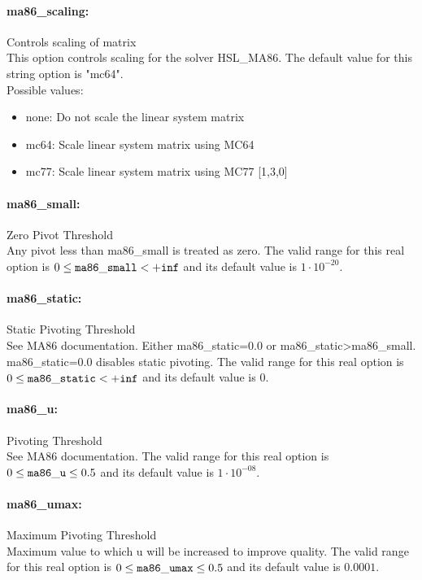 \paragraph{ma86\_scaling:}\label{opt:ma86_scaling} Controls scaling of matrix \\
 This option controls scaling for the solver HSL\_MA86. The default value for this string option is "mc64".
\\ 
Possible values:
\begin{itemize}
   \item none: Do not scale the linear system matrix
   \item mc64: Scale linear system matrix using MC64
   \item mc77: Scale linear system matrix using MC77 [1,3,0]
\end{itemize}

\paragraph{ma86\_small:}\label{opt:ma86_small} Zero Pivot Threshold \\
 Any pivot less than ma86\_small is treated as zero. The valid range for this real option is 
$0 \le {\tt ma86\_small } <  {\tt +inf}$
and its default value is $1 \cdot 10^{-20}$.


\paragraph{ma86\_static:}\label{opt:ma86_static} Static Pivoting Threshold \\
 See MA86 documentation. Either ma86\_static=0.0 or ma86\_static>ma86\_small. ma86\_static=0.0 disables static pivoting. The valid range for this real option is 
$0 \le {\tt ma86\_static } <  {\tt +inf}$
and its default value is $0$.


\paragraph{ma86\_u:}\label{opt:ma86_u} Pivoting Threshold \\
 See MA86 documentation. The valid range for this real option is 
$0 \le {\tt ma86\_u } \le 0.5$
and its default value is $1 \cdot 10^{-08}$.


\paragraph{ma86\_umax:}\label{opt:ma86_umax} Maximum Pivoting Threshold \\
 Maximum value to which u will be increased to improve quality. The valid range for this real option is 
$0 \le {\tt ma86\_umax } \le 0.5$
and its default value is $0.0001$.


